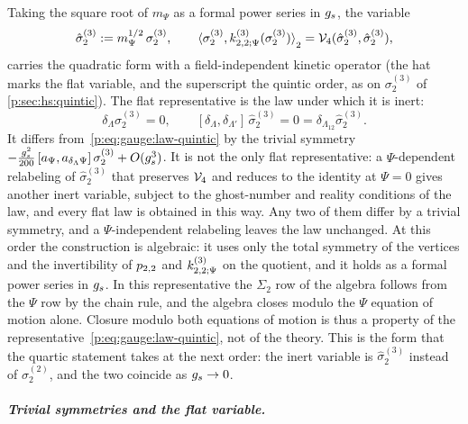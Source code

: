 Taking the square root of $m_\Psi$ as a formal power series in $g_s$, the variable
\begin{equation}
  \label{p:eq:gauge:flat-variable}
  \hat\sigma_2^{(3)}
    := m_\Psi^{1/2} \, \sigma_2^{(3)},
  \qquad
  \pair[2]{\sigma_2^{(3)}}{\kin{2}{\Psi}{3}(\sigma_2^{(3)})}
    = \vertex{4}(\hat\sigma_2^{(3)}, \hat\sigma_2^{(3)}),
\end{equation}
carries the quadratic form with a field-independent kinetic operator (the hat marks the flat variable, and the superscript the quintic order, as on $\sigma_2^{(3)}$ of \cref{p:sec:hs:quintic}).
The flat representative is the law under which it is inert:
\begin{equation}
  \label{p:eq:gauge:closure}
  \delta_\Lambda \hat\sigma_2^{(3)}
    = 0,
  \qquad
  [\delta_{\Lambda}, \delta_{\Lambda'}] \, \hat\sigma_2^{(3)}
    = 0
    = \delta_{\Lambda_{12}} \hat\sigma_2^{(3)}.
\end{equation}
It differs from~\eqref{p:eq:gauge:law-quintic} by the trivial symmetry $- \tfrac{g_s^2}{200} \, [a_\Psi, a_{\delta_\Lambda \Psi}] \, \sigma_2^{(3)} + O(g_s^3)$.
  It is not the only flat representative: a $\Psi$-dependent relabeling of $\hat\sigma_2^{(3)}$ that preserves $\mathcal{V}_{4}$ and reduces to the identity at $\Psi = 0$ gives another inert variable, subject to the ghost-number and reality conditions of the law, and every flat law is obtained in this way.
  Any two of them differ by a trivial symmetry, and a $\Psi$-independent relabeling leaves the law unchanged.
At this order the construction is algebraic: it uses only the total symmetry of the vertices and the invertibility of $p_{2,2}$ and $\kin{2}{\Psi}{3}$ on the quotient, and it holds as a formal power series in $g_s$.
In this representative the $\Sigma_2$ row of the algebra follows from the $\Psi$ row by the chain rule, and the algebra closes modulo the $\Psi$ equation of motion alone.
Closure modulo both equations of motion is thus a property of the representative~\eqref{p:eq:gauge:law-quintic}, not of the theory.
This is the form that the quartic statement takes at the next order: the inert variable is $\hat\sigma_2^{(3)}$ instead of $\sigma_2^{(2)}$, and the two coincide as $g_s \to 0$.




\subparagraph{Trivial symmetries and the flat variable.}

